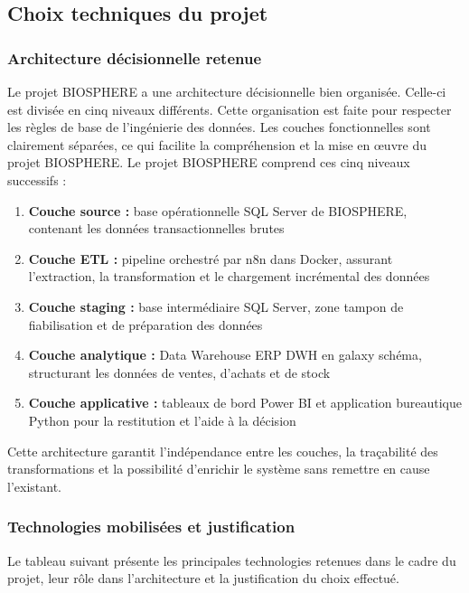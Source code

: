 \subsection{Choix techniques du projet}
\subsubsection{Architecture décisionnelle retenue}
Le projet BIOSPHERE a une architecture décisionnelle bien organisée. Celle-ci est divisée en cinq niveaux différents. Cette organisation est faite pour respecter les règles de base de l'ingénierie des données. Les couches fonctionnelles sont clairement séparées, ce qui facilite la compréhension et la mise en œuvre du projet BIOSPHERE. Le projet BIOSPHERE comprend ces cinq niveaux successifs :
\begin{enumerate}
    \item \textbf{Couche source :} base opérationnelle SQL Server de BIOSPHERE, contenant les données transactionnelles brutes
    \item \textbf{Couche ETL :} pipeline orchestré par n8n dans Docker, assurant l'extraction, la transformation et le chargement incrémental des données
    \item \textbf{Couche staging :} base intermédiaire SQL Server, zone tampon de fiabilisation et de préparation des données
    \item \textbf{Couche analytique :} Data Warehouse ERP DWH en galaxy schéma, structurant les données de ventes, d'achats et de stock
    \item \textbf{Couche applicative :} tableaux de bord Power BI et application bureautique Python pour la restitution et l'aide à la décision
\end{enumerate}
Cette architecture garantit l'indépendance entre les couches, la traçabilité des transformations et la possibilité d'enrichir le système sans remettre en cause l'existant.
\subsubsection{Technologies mobilisées et justification}

Le tableau suivant présente les principales technologies retenues dans le cadre du projet, leur rôle dans l'architecture et la justification du choix effectué.

